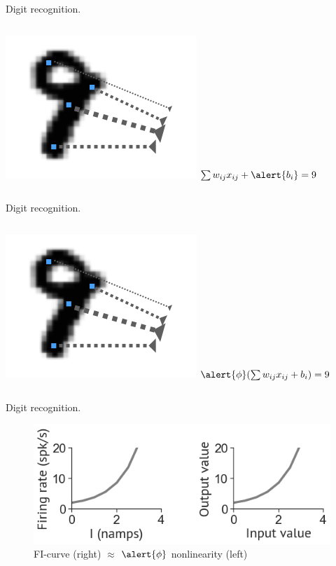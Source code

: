 \documentclass[10pt]{beamer}
\begin{document}
\begin{frame}[fragile]{Digit recognition.}
\begin{columns}
\centering
\includegraphics[scale=0.5]{images/nine_wx.png} 
\centering
 $\sum w_{ij} x_{ij} + \alert{b_i} = 9$
\end{columns}
\end{frame}

\begin{frame}[fragile]{Digit recognition.}
\begin{columns}
\centering
\includegraphics[scale=0.5]{images/nine_wx.png} 
\centering
 $\alert{\phi}(\sum w_{ij} x_{ij} + b_i) = 9$
\end{columns}
\end{frame}

\begin{frame}[fragile]{Digit recognition.}
\begin{figure}
    \centering
    \includegraphics[scale=0.5]{images/phi.png}
    \caption{FI-curve (right) $\approx$ $\alert{\phi}$ nonlinearity (left)}
\end{figure}

\end{frame}
\end{document}
